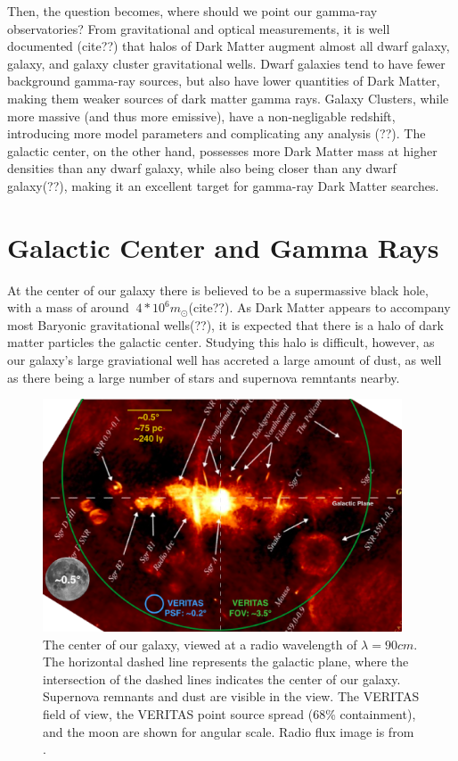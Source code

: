 Then, the question becomes, where should we point our gamma-ray observatories?
From gravitational and optical measurements, it is well documented (cite??) that halos of Dark Matter augment almost all dwarf galaxy, galaxy, and galaxy cluster gravitational wells.
Dwarf galaxies tend to have fewer background gamma-ray sources, but also have lower quantities of Dark Matter, making them weaker sources of dark matter gamma rays.
Galaxy Clusters, while more massive (and thus more emissive), have a non-negligable redshift, introducing more model parameters and complicating any analysis (??).
The galactic center, on the other hand, possesses more Dark Matter mass at higher densities than any dwarf galaxy, while also being closer than any dwarf galaxy(??), making it an excellent target for gamma-ray Dark Matter searches.


\section{Galactic Center and Gamma Rays}

At the center of our galaxy there is believed to be a supermassive black hole, with a mass of around $~4*10^6m_{\odot}$(cite??).
As Dark Matter appears to accompany most Baryonic gravitational wells(??), it is expected that there is a halo of dark matter particles the galactic center.
Studying this halo is difficult, however, as our galaxy's large graviational well has accreted a large amount of dust, as well as there being a large number of stars and supernova remntants nearby.

\begin{figure}[h]
  \begin{center}
    \includegraphics[width=0.95\textwidth]{images/GalacticCenterInRadio.eps}
    \caption[Galactic Center in Radio]{The center of our galaxy, viewed at a radio wavelength of $\lambda=90cm$.  The horizontal dashed line represents the galactic plane, where the intersection of the dashed lines indicates the center of our galaxy.  Supernova remnants and dust are visible in the view.  The VERITAS field of view, the VERITAS point source spread (68\% containment), and the moon are shown for angular scale.  Radio flux image is from \cite{galactic_center_in_radio}.}
  \end{center}
\end{figure}

